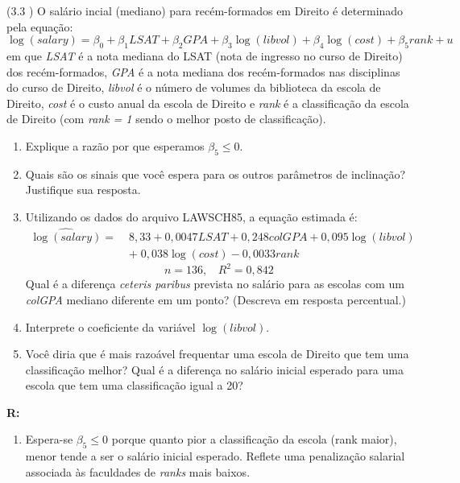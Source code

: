 \documentclass[12pt,letterpaper, onecolumn]{exam}
\renewenvironment{solution}
  {\par\noindent\textbf{R:}\enspace\color{blue}}
  {\par\color{black}}
\begin{document}
\begin{questions}
\question (3.3 \citep{wooldridge2010}) O salário incial (mediano) para recém-formados em Direito é determinado pela equação:\begin{equation*}
    \log(salary) = \beta_0 + \beta_1LSAT + \beta_2GPA + \beta_3\log(libvol) + \beta_4\log(cost) + \beta_5rank + u
\end{equation*} em que \textit{LSAT} é a nota mediana do LSAT (nota de ingresso no curso de Direito) dos recém-formados, \textit{GPA} é a nota mediana dos recém-formados nas disciplinas do curso de Direito, \textit{libvol} é o número de volumes da biblioteca da escola de Direito, \textit{cost} é o custo anual da escola de Direito e \textit{rank} é a classificação da escola de Direito (com \textit{rank = 1} sendo o melhor posto de classificação).
\begin{enumerate}[label=(\alph*)]
    \item Explique a razão por que esperamos $\beta_5 \leq 0$.
    \item Quais são os sinais que você espera para os outros parâmetros de inclinação? Justifique sua resposta.
    \item Utilizando os dados do arquivo LAWSCH85, a equação estimada é:
    \begin{equation*}\begin{aligned}
        \widehat{\log(salary)} =\; & 8,33 + 0,0047LSAT + 0,248colGPA +0,095\log(libvol)\\ & + \; 0,038\log(cost) -0,0033rank
        \end{aligned}
    \end{equation*} \begin{equation*}
        n = 136, \ \ \ \ R^2 = 0,842
    \end{equation*} Qual é a diferença \textit{ceteris paribus} prevista no salário para as escolas com um \textit{colGPA} mediano diferente em um ponto? (Descreva em resposta percentual.)
    \item Interprete o coeficiente da variável $\log(libvol)$.
    \item Você diria que é mais razoável frequentar uma escola de Direito que tem uma classificação melhor? Qual é a diferença no salário inicial esperado para uma escola que tem uma classificação igual a 20?
\end{enumerate}
\begin{solution}
\begin{enumerate}[label=(\alph*)]
    \item Espera-se \(\beta_5\leq 0\) porque quanto pior a classificação da escola (rank maior), menor tende a ser o salário inicial esperado. Reflete uma penalização salarial associada às faculdades de \textit{ranks} mais baixos.

\end{enumerate}
\end{solution}
\end{questions}
\end{document}
